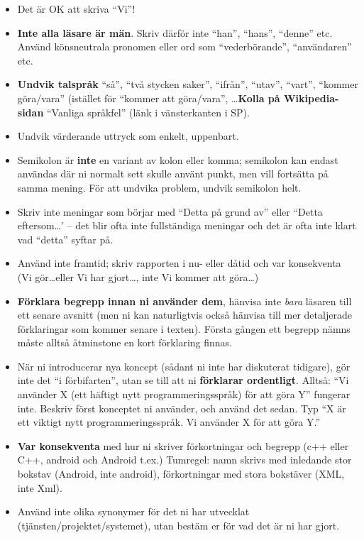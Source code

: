 \documentclass[swedish, a4paper,12pt]{article}
\begin{document}
\begin{itemize}
\item    Det är OK att skriva ``Vi''!

\item    \textbf{Inte alla läsare är män}.  Skriv därför inte ``han'', ``hans'', ``denne'' etc.  Använd könsneutrala pronomen eller ord som ``vederbörande'', ``användaren'' etc.

\item    \textbf{Undvik talspråk} ``så'', ``två stycken saker'', ``ifrån'', ``utav'', ``vart'', ``kommer göra/vara'' (istället för ``kommer att göra/vara'', \ldots \textbf{Kolla på Wikipedia-sidan} ``Vanliga språkfel'' (länk i vänsterkanten i SP).

\item    Undvik värderande uttryck som enkelt, uppenbart.

\item    Semikolon är \textbf{inte} en variant av kolon eller komma; semikolon kan endast användas där ni normalt sett skulle använt punkt, men vill fortsätta på samma mening. För att undvika problem, undvik semikolon helt.

\item    Skriv inte meningar som börjar med ``Detta på grund av'' eller ``Detta eftersom\ldots' -- det blir ofta inte fullständiga meningar och det är ofta inte klart vad ``detta'' syftar på.

\item    Använd inte framtid; skriv rapporten i nu- eller dåtid och var konsekventa (Vi gör\ldots eller Vi har gjort\ldots, inte Vi kommer att göra\ldots)

\item    \textbf{Förklara begrepp innan ni använder dem}, hänvisa inte \emph{bara} läsaren till ett senare avsnitt (men ni kan naturligtvis också hänvisa till mer detaljerade förklaringar som kommer senare i texten).  Första gången ett begrepp nämns måste alltså åtminstone en kort förklaring finnas.

\item    När ni introducerar nya koncept (sådant ni inte har diskuterat tidigare), gör inte det ``i förbifarten'', utan se till att ni \textbf{förklarar ordentligt}.  Alltså: ``Vi använder X (ett häftigt nytt programmeringsspråk) för att göra Y'' fungerar inte.  Beskriv först konceptet ni använder, och använd det sedan.  Typ ``X är ett viktigt nytt programmeringsspråk.  Vi använder X för att göra Y.''

\item    \textbf{Var konsekventa} med hur ni skriver förkortningar och begrepp (c++ eller C++, android och Android t.ex.) Tumregel: namn skrivs med inledande stor bokstav (Android, inte android), förkortningar med stora bokstäver (XML, inte Xml).
\item    Använd inte olika synonymer för det ni har utvecklat (tjänsten/projektet/systemet), utan bestäm er för vad det är ni har gjort.


\end{itemize}
\end{document}
